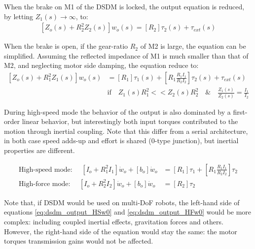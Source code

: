 When the brake on M1 of the DSDM is locked, the output equation is reduced, by letting $Z_1(s) \rightarrow \infty$, to:
\begin{align}
\left[
 Z_o(s)  + R_2^2 Z_2(s)
\right] w_o(s) = 
\left[
R_2
\right] \tau_2(s)  + 
\tau_{ext}(s)
\label{eq:dsdm_output_HF}
\end{align}

When the brake is open, if the gear-ratio $R_2$ of M2 is large, the equation can be simplified. 
%
%
Assuming the reflected impedance of M1 is much smaller than that of M2, and neglecting motor side damping, the equation reduce to:
\begin{align}
\left[
Z_o(s)  + R_1^2 Z_1(s)
\right] w_o(s) &= 
\left[
R_1
\right] \tau_1(s)  + 
\left[
R_1 \frac{R_1 I_1}{R_2 I_2}
\right] \tau_2(s)  + 
\tau_{ext}(s) \\
&\text{if} \quad Z_1(s) R_1^2 << Z_2(s) R_2^2 
\quad \& \quad \frac{Z_1(s)}{Z_2(s)} = \frac{I_1}{I_2}
\label{eq:dsdm_output_HF}
\end{align}

During high-speed mode the behavior of the output is also dominated by a first-order linear behavior, but interestingly both input torques contributed to the motion through inertial coupling. Note that this differ from a serial architecture, in both case speed adds-up and effort is shared (0-type junction), but inertial properties are different.

\begin{align}
\text{High-speed mode: } \quad \left[ I_o + R_1^2 I_1 \right] \dot{w}_o +  \left[ b_o \right] \dot{w}_o  &= \left[ R_1 \right] \tau_1 + \left[ R_1 \frac{R_1 I_1}{R_2 I_2} \right] \tau_2 
\label{eq:dsdm_output_HSw0} \\
\text{High-force mode: } \quad \left[ I_o + R_2^2 I_2 \right] \dot{w}_o +  \left[ b_o \right] \dot{w}_o  &= \left[ R_2 \right] \tau_2 
\label{eq:dsdm_output_HFw0}
\end{align}

Note that, if DSDM would be used on multi-DoF robots, the left-hand side of equations \eqref{eq:dsdm_output_HSw0} and \eqref{eq:dsdm_output_HFw0} would be more complex: including coupled inertial effects, gravitation forces and others. However, the right-hand side of the equation would stay the same: the motor torques transmission gains would not be affected.

